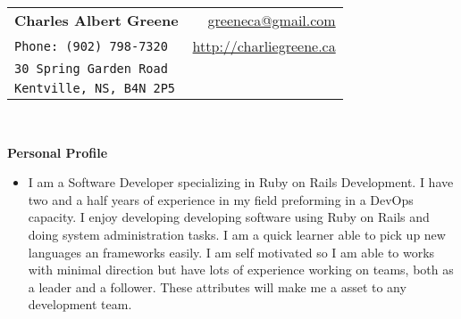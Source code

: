 \documentclass[letterpaper,11pt]{article}
\newcommand{\resheading}[1]{{\large \colorbox{mygrey}{\begin{minipage}{\textwidth}{\textbf{#1 \vphantom{p\^{E}} }}\end{minipage}} }}
\begin{document}
\newcommand{\mywebheader}{
\begin{tabular*}{7in}{l@{\extracolsep{\fill}}r}
    \textbf{\LARGE Charles Albert Greene} & \href{mailto:greeneca@gmail.com}{greeneca@gmail.com}\\
    {\footnotesize \texttt{Phone: (902) 798-7320}} & {\href{http://charliegreene.ca}{http://charliegreene.ca}} \\
    {\footnotesize \texttt{30 Spring Garden Road}}\\
    {\footnotesize \texttt{Kentville, NS, B4N 2P5}}\\
    \end{tabular*}
\\
\vspace{0.1in}}


\mywebheader


\resheading{Personal Profile} %
    \begin{itemize}
        \item[] I am a Software Developer specializing in Ruby on Rails Development. I have two and a half years of experience in my field preforming in a DevOps capacity. I enjoy developing
          developing software using Ruby on Rails and doing system administration tasks. I am a quick learner able to pick up new languages an frameworks easily. I am self motivated so I am able to works with minimal
          direction but have lots of experience working on teams, both as a leader and a follower. These attributes will make me a asset to any development team.
    \end{itemize}
\end{document}
